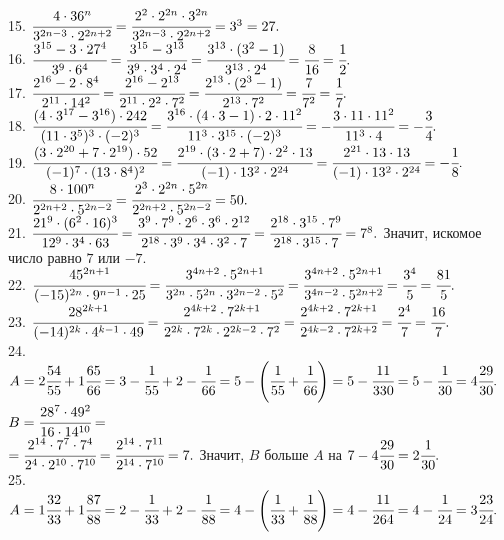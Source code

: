 \documentclass[12pt]{article}
\begin{document}
15. $\cfrac{4\cdot36^n}{3^{2n-3}\cdot2^{2n+2}}=\cfrac{2^2\cdot2^{2n}\cdot3^{2n}}{3^{2n-3}\cdot2^{2n+2}}=3^3=27.$\\
16. $\cfrac{3^{15}-3\cdot27^4}{3^9\cdot6^4}=\cfrac{3^{15}-3^{13}}{3^9\cdot3^4\cdot2^4}=\cfrac{3^{13}\cdot(3^2-1)}{3^{13}\cdot2^4}=\cfrac{8}{16}=\cfrac{1}{2}.$\\
17. $\cfrac{2^{16}-2\cdot 8^4}{2^{11}\cdot 14^2}=\cfrac{2^{16}-2^{13}}{2^{11}\cdot 2^2\cdot7^2}=\cfrac{2^{13}\cdot(2^3-1)}{2^{13}\cdot7^2}=\cfrac{7}{7^2}=\cfrac{1}{7}.$\\
18. $\cfrac{(4\cdot3^{17}-3^{16})\cdot242}{(11\cdot 3^5)^3\cdot(-2)^3}=\cfrac{3^{16}\cdot(4\cdot3-1)\cdot2\cdot11^2}{11^3\cdot 3^{15}\cdot(-2)^3}=
-\cfrac{3\cdot11\cdot11^2}{11^3\cdot4}=-\cfrac{3}{4}.$\\
19. $\cfrac{(3\cdot 2^{20}+7\cdot 2^{19})\cdot 52}{(-1)^7\cdot(13\cdot8^4)^2}=\cfrac{2^{19}\cdot(3\cdot2+7)\cdot 2^2\cdot13}{(-1)\cdot13^2\cdot2^{24}}=
\cfrac{2^{21}\cdot13\cdot13}{(-1)\cdot13^2\cdot2^{24}}=-\cfrac{1}{8}.$\\
20. $\cfrac{8\cdot100^n}{2^{2n+2}\cdot5^{2n-2}}=\cfrac{2^3\cdot2^{2n}\cdot5^{2n}}{2^{2n+2}\cdot5^{2n-2}}=50.$\\
21. $\cfrac{21^9\cdot(6^2\cdot16)^3}{12^9\cdot3^4\cdot63}=\cfrac{3^9\cdot7^9\cdot2^6\cdot3^6\cdot2^{12}}{2^{18}\cdot3^9\cdot3^4\cdot3^2\cdot7}=
\cfrac{2^{18}\cdot3^{15}\cdot7^9}{2^{18}\cdot3^{15}\cdot7}=7^8.$ Значит, искомое число равно $7$ или $-7.$\\
22. $\cfrac{45^{2n+1}}{(-15)^{2n}\cdot 9^{n-1}\cdot25}=\cfrac{3^{4n+2}\cdot5^{2n+1}}{3^{2n}\cdot5^{2n}\cdot 3^{2n-2}\cdot5^2}=
\cfrac{3^{4n+2}\cdot5^{2n+1}}{3^{4n-2}\cdot5^{2n+2}}=\cfrac{3^4}{5}=\cfrac{81}{5}.$\\
23. $\cfrac{28^{2k+1}}{(-14)^{2k}\cdot4^{k-1}\cdot49}=\cfrac{2^{4k+2}\cdot7^{2k+1}}{2^{2k}\cdot7^{2k}\cdot2^{2k-2}\cdot7^2}=
\cfrac{2^{4k+2}\cdot7^{2k+1}}{2^{4k-2}\cdot7^{2k+2}}=\cfrac{2^4}{7}=\cfrac{16}{7}.$\\
24. $A=2\cfrac{54}{55}+1\cfrac{65}{66}=3-\cfrac{1}{55}+2-\cfrac{1}{66}=5-\left(\cfrac{1}{55}+\cfrac{1}{66}\right)=5-\cfrac{11}{330}=5-\cfrac{1}{30}=4\cfrac{29}{30}.$
$B=\cfrac{28^7\cdot49^2}{16\cdot14^{10}}=$\\$=\cfrac{2^{14}\cdot7^{7}\cdot7^4}{2^4\cdot2^{10}\cdot7^{10}}=\cfrac{2^{14}\cdot7^{11}}{2^{14}\cdot7^{10}}=7.$ Значит, $B$ больше $A$ на $7-4\cfrac{29}{30}=2\cfrac{1}{30}.$\\
25. $A=1\cfrac{32}{33}+1\cfrac{87}{88}=2-\cfrac{1}{33}+2-\cfrac{1}{88}=4-\left(\cfrac{1}{33}+\cfrac{1}{88}\right)=4-\cfrac{11}{264}=4-\cfrac{1}{24}=3\cfrac{23}{24}.$
\end{document}
